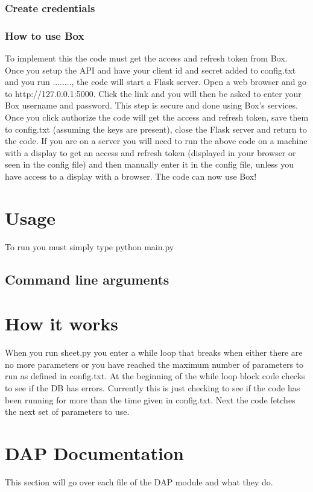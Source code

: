 \documentclass[12pt]{article}
\begin{document}
\subsubsection{Create credentials}


\subsubsection{How to use Box}
To implement this the code must get the access and refresh token from Box.  Once you setup the API and have your client id and secret added to config.txt and you run ........, the code will start a Flask server.  Open a web browser and go to http://127.0.0.1:5000.  Click the link and you will then be asked to enter your Box username and password.  This step is secure and done using Box's services.  Once you click authorize the code will get the access and refresh token, save them to config.txt (assuming the keys are present), close the Flask server and return to the code.  If you are on a server you will need to run the above code on a machine with a display to get an access and refresh token (displayed in your browser or seen in the config file) and then manually enter it in the config file, unless you have access to a display with a browser.  The code can now use Box!\\

\section{Usage}
To run you must simply type python main.py

\subsection{Command line arguments}

\section{How it works}
When you run sheet.py you enter a while loop that breaks when either there are no more parameters or you have reached the maximum number of parameters to run as defined in config.txt.  At the beginning of the while loop block code checks to see if the DB has errors.  Currently this is just checking to see if the code has been running for more than the time given in config.txt.  Next the code fetches the next set of parameters to use.  

\section{DAP Documentation}
This section will go over each file of the DAP module and what they do.\\
\end{document}
